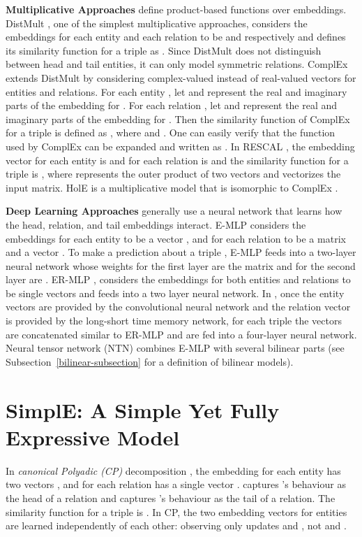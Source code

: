 \documentclass{article}
\begin{document}
\textbf{Multiplicative Approaches} define product-based functions over embeddings. DistMult \cite{yang2014embedding}, one of the simplest multiplicative approaches, considers the embeddings for each entity and each relation to be  and  respectively and defines its similarity function for a triple  as . Since DistMult does not distinguish between head and tail entities, it can only model symmetric relations. ComplEx \cite{trouillon2016complex} extends DistMult by considering complex-valued instead of real-valued vectors for entities and relations. For each entity , let  and  represent the real and imaginary parts of the embedding for . For each relation , let  and  represent the real and imaginary parts of the embedding for . Then the similarity function of ComplEx for a triple  is defined as , where   and . One can easily verify that the function used by ComplEx can be expanded and written as . In RESCAL \cite{nickel2011three}, the embedding vector for each entity  is  and for each relation  is  and the similarity function for a triple  is , where  represents the outer product of two vectors and  vectorizes the input matrix. HolE \cite{nickel2016holographic} is a multiplicative model that is isomorphic to ComplEx \cite{hayashi2017equivalence}.

\textbf{Deep Learning Approaches} generally use a neural network that learns how the head, relation, and tail embeddings interact. 
E-MLP \cite{socher2013reasoning} considers the embeddings for each entity  to be a vector , and for each relation  to be a matrix  and a vector . To make a prediction about a triple , E-MLP feeds  into a two-layer neural network whose weights for the first layer are the matrix  and for the second layer are . 
ER-MLP \cite{KnowledgeVault}, 
considers the embeddings for both entities and relations to be single vectors and feeds  into a two layer neural network. In \cite{santoro2017simple}, once the entity vectors are provided by the convolutional neural network and the relation vector is provided by the long-short time memory network, for each triple the vectors are concatenated similar to ER-MLP and are fed into a four-layer neural network. Neural tensor network (NTN) \cite{socher2013reasoning} combines E-MLP with several bilinear parts (see Subsection~\ref{bilinear-subsection} for a definition of bilinear models).

\section{SimplE: A Simple Yet Fully Expressive Model}
In \emph{canonical Polyadic (CP)} decomposition \cite{hitchcock1927expression}, the embedding for each entity  has two vectors , and for each relation  has a single vector . 
 captures 's behaviour as the head of a relation and  captures 's behaviour as the tail of a relation.
The similarity function for a triple  is . 
In CP, the two embedding vectors for entities are learned independently of each other: observing  only updates  and , not  and .
\end{document}
